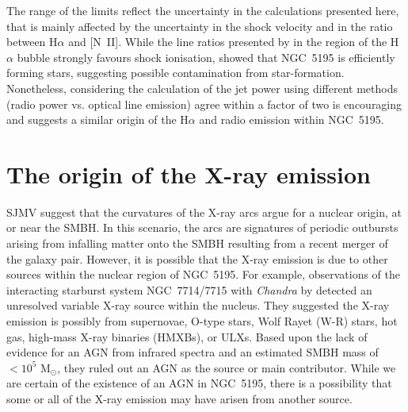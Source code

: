 \documentclass[fleqn,usenatbib]{mnras}
\begin{document}
{The range of the limits reflect the uncertainty in the calculations presented here, that is mainly affected by the uncertainty in the shock velocity and in the ratio between H$\alpha$ and [N~II]. While the line ratios 
presented by \cite{Hoopes-Walterbos} in the region of the H$\alpha$ bubble strongly favours shock ionisation, 
\cite{Alataloetal2016} showed that NGC~5195 is efficiently forming stars, suggesting possible contamination 
from star-formation. Nonetheless, considering the calculation of the jet power using different methods (radio 
power vs. optical line 
emission) agree within a factor of two is encouraging and suggests a similar origin of the H$\alpha$ and 
radio emission within NGC~5195.}




\section{The origin of the X-ray emission}
\label{sec:xrays_orign}

SJMV suggest that the curvatures of the X-ray arcs argue for a nuclear origin, at or near the SMBH. In this 
scenario, the arcs are signatures of periodic outbursts arising from infalling matter onto the SMBH 
resulting from a recent merger of the galaxy pair. However, it is possible that the X-ray emission is due 
to other sources within the nuclear region of NGC~5195. 
For example, observations of the interacting starburst system NGC~7714/7715 with \textit{Chandra} by 
\cite{SSN2005} detected an unresolved variable X-ray source within the nucleus. They suggested the X-ray 
emission is possibly from supernovae, O-type stars, Wolf Rayet (W-R) stars,
hot gas, high-mass X-ray binaries (HMXBs), or ULXs. Based upon the lack of evidence for an AGN from 
infrared spectra and an estimated SMBH mass of $< 10^{5}$ M$_{\odot}$, they ruled out an AGN as the source 
or main contributor. While we are certain of the existence of an AGN in NGC~5195, there is a possibility 
that some or all of the X-ray emission may have arisen from another source. 
\end{document}
